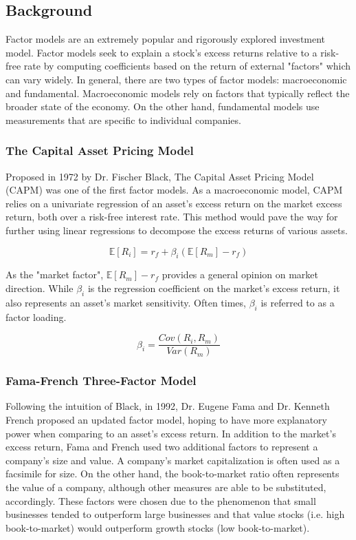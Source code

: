 \documentclass[final]{article}
\begin{document}
\subsection{Background}
\hspace{\parindent}Factor models are an extremely popular and rigorously explored investment model. Factor models seek to explain a stock's excess returns relative to a risk-free rate by computing coefficients based on the return of external "factors" which can vary widely. In general, there are two types of factor models: macroeconomic and fundamental. Macroeconomic models rely on factors that typically reflect the broader state of the economy. On the other hand, fundamental models use measurements that are specific to individual companies. 

\subsubsection{The Capital Asset Pricing Model}
\hspace{\parindent}Proposed in 1972 by Dr. Fischer Black, The Capital Asset Pricing Model (CAPM) was one of the first factor models. As a macroeconomic model, CAPM relies on a univariate regression of an asset's excess return on the market excess return, both over a risk-free interest rate. This method would pave the way for further using linear regressions to decompose the excess returns of various assets.

\begin{equation}
    \mathbb{E}\left[R_i\right]=r_f+\beta_i\left(\mathbb{E}\left[R_m\right]-r_f\right)
\end{equation}

As the "market factor", $\mathbb{E}\left[R_m\right]-r_f$ provides a general opinion on market direction. While $\beta_i$ is the regression coefficient on the market's excess return, it also represents an asset's market sensitivity. Often times, $\beta_i$ is referred to as a factor loading.

\begin{equation}
    \beta_i=\frac{Cov\left(R_i,R_m\right)}{Var\left(R_m\right)}
\end{equation}

\subsubsection{Fama-French Three-Factor Model}
\hspace{\parindent}Following the intuition of Black, in 1992, Dr. Eugene Fama and Dr. Kenneth French proposed an updated factor model, hoping to have more explanatory power when comparing to an asset's excess return. In addition to the market's excess return, Fama and French used two additional factors to represent a company's size and value. A company's market capitalization is often used as a facsimile for size. On the other hand, the book-to-market ratio often represents the value of a company, although other measures are able to be substituted, accordingly. These factors were chosen due to the phenomenon that small businesses tended to outperform large businesses and that value stocks (i.e. high book-to-market) would outperform growth stocks (low book-to-market).
\end{document}
